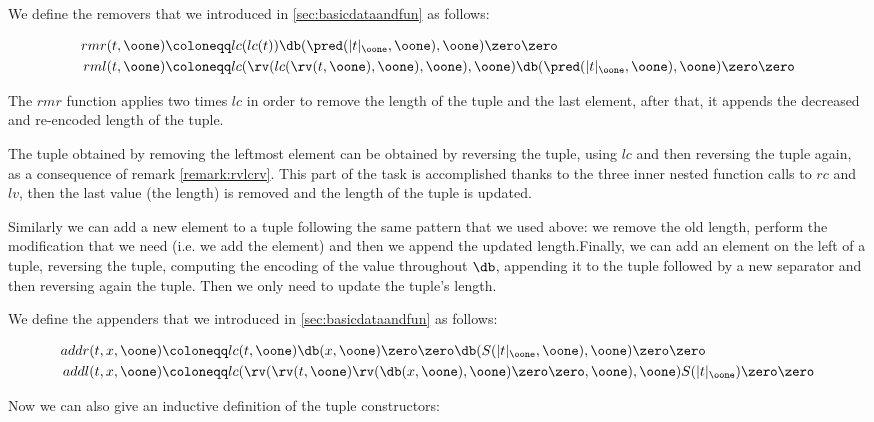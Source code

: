 \begin{defn}

We define the removers that we introduced in \ref{sec:basicdataandfun} as follows:

\begin{align*}
rmr(t, \oone) &\coloneqq lc(lc(t)) \db(\pred(|t|_\oone, \oone), \oone)\zero\zero\\
rml(t, \oone) &\coloneqq lc(\rv(lc(\rv(t, \oone), \oone), \oone), \oone)\db(\pred(|t|_\oone, \oone), \oone)\zero\zero
\end{align*}

\end{defn}

The $rmr$ function applies two times $lc$ in order to remove the length of the tuple and the last element, after that, it appends the decreased and re-encoded length of the tuple.

The tuple obtained by removing the leftmost element can be obtained by reversing the tuple, using $lc$ and then reversing the tuple again, as a consequence of remark \ref{remark:rvlcrv}. This part of the task is accomplished thanks to the three inner nested function calls to $rc$ and $lv$, then the last value (the length) is removed and the length of the tuple is updated.

Similarly we can add a new element to a tuple following the same pattern that we used above: we remove the old length, perform the modification that we need (i.e. we add the element) and then we append the updated length.Finally, we can add an element on the left of a tuple, reversing the tuple, computing the encoding of the value throughout $\db$, appending it to the tuple followed by a new separator and then reversing again the tuple. Then we only need to update the tuple's length.

\begin{defn}

We define the appenders that we introduced in \ref{sec:basicdataandfun} as follows:

\begin{align*}
addr(t, x, \oone)&\coloneqq lc(t, \oone)\db(x, \oone)\zero\zero\db(S(|t|_\oone, \oone), \oone)\zero\zero\\
addl(t, x, \oone)&\coloneqq lc(\rv(\rv(t, \oone)\rv(\db(x, \oone), \oone)\zero\zero, \oone), \oone)S(|t|_\oone)\zero\zero
\end{align*}
\end{defn}

Now we can also give an inductive definition of the tuple constructors:

